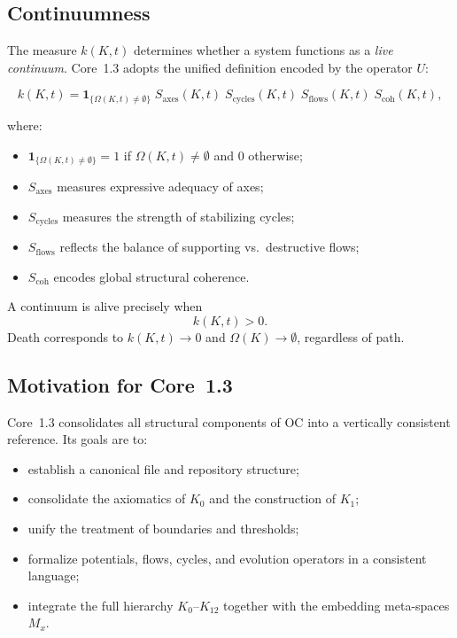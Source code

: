 \subsection{Continuumness}

The measure \(k(K,t)\) determines whether a system functions as a \emph{live continuum}.  
Core~1.3 adopts the unified definition encoded by the operator \(U\):

\[
k(K,t) =
\mathbf{1}_{\{\Omega(K,t)\neq\emptyset\}}\;
S_{\mathrm{axes}}(K,t)\;
S_{\mathrm{cycles}}(K,t)\;
S_{\mathrm{flows}}(K,t)\;
S_{\mathrm{coh}}(K,t),
\]

where:

\begin{itemize}
    \item \(\mathbf{1}_{\{\Omega(K,t)\neq\emptyset\}}=1\) if
          \(\Omega(K,t)\neq\emptyset\) and \(0\) otherwise;
    \item \(S_{\mathrm{axes}}\) measures expressive adequacy of axes;
    \item \(S_{\mathrm{cycles}}\) measures the strength of stabilizing cycles;
    \item \(S_{\mathrm{flows}}\) reflects the balance of supporting vs.\ destructive flows;
    \item \(S_{\mathrm{coh}}\) encodes global structural coherence.
\end{itemize}

A continuum is alive precisely when
\[
k(K,t) > 0.
\]
Death corresponds to \(k(K,t)\to 0\) and \(\Omega(K)\to\emptyset\), regardless of path.

\subsection{Motivation for Core~1.3}

Core~1.3 consolidates all structural components of OC into a vertically
consistent reference.
Its goals are to:

\begin{itemize}
    \item establish a canonical file and repository structure;
    \item consolidate the axiomatics of \(K_0\) and the construction of \(K_1\);
    \item unify the treatment of boundaries and thresholds;
    \item formalize potentials, flows, cycles, and evolution operators in a consistent language;
    \item integrate the full hierarchy \(K_0\)–\(K_{12}\) together with the embedding meta-spaces \(M_x\).
\end{itemize}


